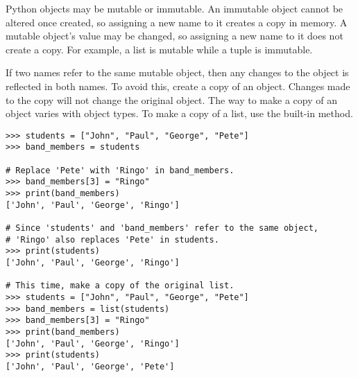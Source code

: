 Python objects may be mutable or immutable.
An immutable object cannot be altered once created, so assigning a new name to it creates a copy in memory.
A mutable object's value may be changed, so assigning a new name to it does not create a copy.
For example, a list is mutable while a tuple is immutable.
\begin{comment} %
\begin{lstlisting}
>>> my_tuple = (1,2)
>>> my_tuple[0] = 3
<<Traceback (most recent call last):
  File "<stdin>", line 1, in <module>
TypeError: 'tuple' object does not support item assignment>>

>>> example_list = [1,2]
>>> example_list[0] = 3
>>> print(example_list)
[3,2]
\end{lstlisting}
\end{comment}

If two names refer to the same mutable object, then any changes to the object is reflected in both names.
To avoid this, create a copy of an object.
Changes made to the copy will not change the original object.
The way to make a copy of an object varies with object types.
To make a copy of a list, use the  built-in method.

\begin{lstlisting}
>>> students = ["John", "Paul", "George", "Pete"]
>>> band_members = students

# Replace 'Pete' with 'Ringo' in band_members.
>>> band_members[3] = "Ringo"
>>> print(band_members)
['John', 'Paul', 'George', 'Ringo']

# Since 'students' and 'band_members' refer to the same object, 
# 'Ringo' also replaces 'Pete' in students.
>>> print(students)
['John', 'Paul', 'George', 'Ringo']

# This time, make a copy of the original list.
>>> students = ["John", "Paul", "George", "Pete"]
>>> band_members = list(students)
>>> band_members[3] = "Ringo"
>>> print(band_members)
['John', 'Paul', 'George', 'Ringo']
>>> print(students)
['John', 'Paul', 'George', 'Pete']
\end{lstlisting}

